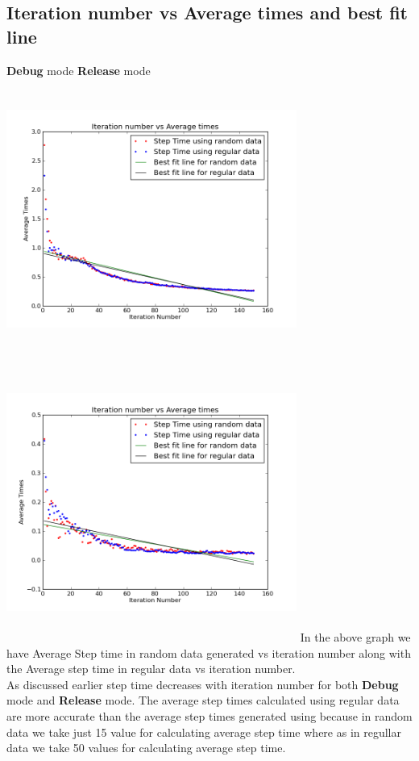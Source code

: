 \documentclass{article}
\begin{document}
\subsection{Iteration number vs Average times and best fit line}
\textbf{Debug} mode \hfill \textbf{Release} mode\\
\includegraphics[width=270pt,height=260pt]{g27_lab09_plot05_debug} \hfill  
\includegraphics[width=270pt,height=260pt]{g27_lab09_plot05_release}
In the above graph we have Average Step time in random data generated vs iteration number along with the Average step time in regular data vs iteration number.\\
As discussed earlier step time decreases with iteration number for both \textbf{Debug} mode and \textbf{Release} mode.
The average step times calculated using regular data are more accurate than the average step times generated using because in random data we take just 15 value for calculating average step time where as in regullar data we take 50 values for calculating average step time.
\end{document}
